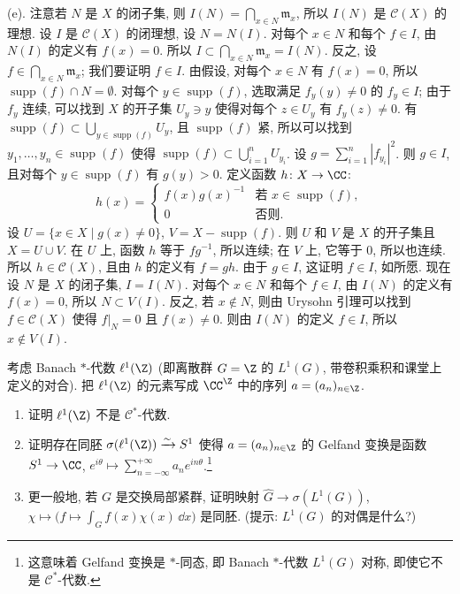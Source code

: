 \begin{exercise}[$\mathcal{C}(X)$ 的谱]
\begin{solution}
(e). 注意若 $N$ 是 $X$ 的闭子集, 则 $I(N) = \bigcap_{x \in N}\mathfrak{m}_x$, 所以 $I(N)$ 是 $\mathcal{C}(X)$ 的理想.
设 $I$ 是 $\mathcal{C}(X)$ 的闭理想, 设 $N = N(I)$. 对每个 $x \in N$ 和每个 $f \in I$, 由 $N(I)$ 的定义有 $f(x) = 0$. 所以 $I \subset \bigcap_{x \in N}\mathfrak{m}_x = I(N)$. 反之, 设 $f \in \bigcap_{x \in N}\mathfrak{m}_x$; 我们要证明 $f \in I$. 由假设, 对每个 $x \in N$ 有 $f(x) = 0$, 所以 $\operatorname{supp}(f) \cap N = \emptyset$. 对每个 $y \in \operatorname{supp}(f)$, 选取满足 $f_y(y) \neq 0$ 的 $f_y \in I$; 由于 $f_y$ 连续, 可以找到 $X$ 的开子集 $U_y \ni y$ 使得对每个 $z \in U_y$ 有 $f_y(z) \neq 0$. 有 $\operatorname{supp}(f) \subset \bigcup_{y \in \operatorname{supp}(f)}U_y$, 且 $\operatorname{supp}(f)$ 紧, 所以可以找到 $y_1, \ldots, y_n \in \operatorname{supp}(f)$ 使得 $\operatorname{supp}(f) \subset \bigcup_{i=1}^n U_{y_i}$. 设 $g = \sum_{i=1}^n|f_{y_i}|^2$. 则 $g \in I$, 且对每个 $y \in \operatorname{supp}(f)$ 有 $g(y) > 0$. 定义函数 $h \colon X \to \CC$:
\[
h(x) = \begin{cases} f(x)g(x)^{-1} & \text{若 } x \in \operatorname{supp}(f), \\ 0 & \text{否则}. \end{cases}
\]
设 $U = \{x \in X \mid g(x) \neq 0\}$, $V = X - \operatorname{supp}(f)$. 则 $U$ 和 $V$ 是 $X$ 的开子集且 $X = U \cup V$. 在 $U$ 上, 函数 $h$ 等于 $fg^{-1}$, 所以连续; 在 $V$ 上, 它等于 $0$, 所以也连续. 所以 $h \in \mathcal{C}(X)$, 且由 $h$ 的定义有 $f = gh$. 由于 $g \in I$, 这证明 $f \in I$, 如所愿.
现在设 $N$ 是 $X$ 的闭子集, $I = I(N)$. 对每个 $x \in N$ 和每个 $f \in I$, 由 $I(N)$ 的定义有 $f(x) = 0$, 所以 $N \subset V(I)$. 反之, 若 $x \notin N$, 则由 Urysohn 引理可以找到 $f \in \mathcal{C}(X)$ 使得 $f|_N = 0$ 且 $f(x) \neq 0$. 则由 $I(N)$ 的定义 $f \in I$, 所以 $x \notin V(I)$.
\end{solution}
\end{exercise}

\begin{exercise}[$\ell^1(\Z)$ 的谱]
\label{ex:II.5.4}
考虑 Banach $*$-代数 $\ell^1(\Z)$ (即离散群 $G = \Z$ 的 $L^1(G)$, 带卷积乘积和课堂上定义的对合). 把 $\ell^1(\Z)$ 的元素写成 $\CC^{\Z}$ 中的序列 $a = (a_n)_{n \in \Z}$.
\begin{enumerate}
\item[(a)] 证明 $\ell^1(\Z)$ 不是 $\mathcal{C}^*$-代数.
\item[(b)] 证明存在同胚 $\sigma(\ell^1(\Z)) \xrightarrow{\sim} S^1$ 使得 $a = (a_n)_{n \in \Z}$ 的 Gelfand 变换是函数 $S^1 \to \CC$, $e^{i\theta} \longmapsto \sum_{n=-\infty}^{+\infty}a_ne^{in\theta}$.\footnote{这意味着 Gelfand 变换是 $*$-同态, 即 Banach $*$-代数 $L^1(G)$ 对称, 即使它不是 $\mathcal{C}^*$-代数.}
\item[(c)] 更一般地, 若 $G$ 是交换局部紧群, 证明映射 $\widehat{G} \to \sigma(L^1(G))$, $\chi \longmapsto \bigl(f \longmapsto \int_G f(x)\chi(x)\,\dd x\bigr)$ 是同胚. (提示: $L^1(G)$ 的对偶是什么?)
\end{enumerate}
\end{exercise}

